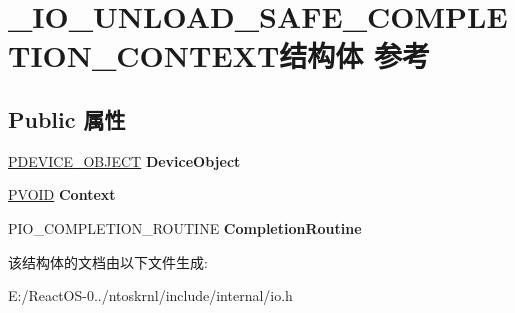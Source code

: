 \hypertarget{struct___i_o___u_n_l_o_a_d___s_a_f_e___c_o_m_p_l_e_t_i_o_n___c_o_n_t_e_x_t}{}\section{\+\_\+\+I\+O\+\_\+\+U\+N\+L\+O\+A\+D\+\_\+\+S\+A\+F\+E\+\_\+\+C\+O\+M\+P\+L\+E\+T\+I\+O\+N\+\_\+\+C\+O\+N\+T\+E\+X\+T结构体 参考}
\label{struct___i_o___u_n_l_o_a_d___s_a_f_e___c_o_m_p_l_e_t_i_o_n___c_o_n_t_e_x_t}
\subsection*{Public 属性}
\begin{DoxyCompactItemize}
\item 
\mbox{\label{struct___i_o___u_n_l_o_a_d___s_a_f_e___c_o_m_p_l_e_t_i_o_n___c_o_n_t_e_x_t_a6cf24537ff2a66a31ec800c74d65e5fd}} 
\hyperlink{struct___d_e_v_i_c_e___o_b_j_e_c_t}{P\+D\+E\+V\+I\+C\+E\+\_\+\+O\+B\+J\+E\+CT} {\bfseries Device\+Object}
\item 
\mbox{\label{struct___i_o___u_n_l_o_a_d___s_a_f_e___c_o_m_p_l_e_t_i_o_n___c_o_n_t_e_x_t_a965129f76af2d4085d2ad05eb5522bf2}} 
\hyperlink{interfacevoid}{P\+V\+O\+ID} {\bfseries Context}
\item 
\mbox{\label{struct___i_o___u_n_l_o_a_d___s_a_f_e___c_o_m_p_l_e_t_i_o_n___c_o_n_t_e_x_t_a356de5f51c2155ac1a7af6a534de3e73}} 
P\+I\+O\+\_\+\+C\+O\+M\+P\+L\+E\+T\+I\+O\+N\+\_\+\+R\+O\+U\+T\+I\+NE {\bfseries Completion\+Routine}
\end{DoxyCompactItemize}


该结构体的文档由以下文件生成\+:\begin{DoxyCompactItemize}
\item 
E\+:/\+React\+O\+S-\/0../ntoskrnl/include/internal/io.\+h\end{DoxyCompactItemize}
